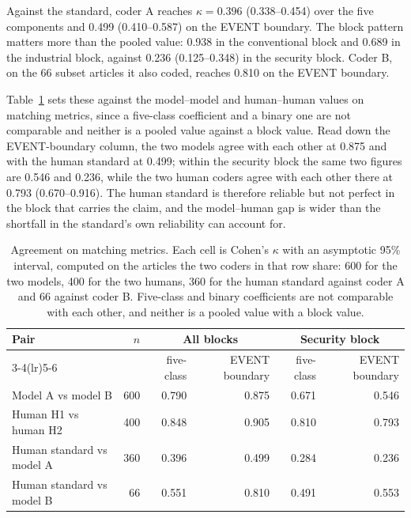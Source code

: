 \documentclass[1p,times]{elsarticle}
\begin{document}
Against the standard, coder A reaches $\kappa = 0.396$ (0.338--0.454) over the five components and 0.499 (0.410--0.587) on the EVENT boundary. The block pattern matters more than the pooled value: 0.938 in the conventional block and 0.689 in the industrial block, against 0.236 (0.125--0.348) in the security block. Coder B, on the 66 subset articles it also coded, reaches 0.810 on the EVENT boundary.

Table~\ref{tab:kappa} sets these against the model--model and human--human values on matching metrics, since a five-class coefficient and a binary one are not comparable and neither is a pooled value against a block value. Read down the EVENT-boundary column, the two models agree with each other at 0.875 and with the human standard at 0.499; within the security block the same two figures are 0.546 and 0.236, while the two human coders agree with each other there at 0.793 (0.670--0.916). The human standard is therefore reliable but not perfect in the block that carries the claim, and the model--human gap is wider than the shortfall in the standard's own reliability can account for.

\begin{table}[!htb]
\centering\small
\caption{Agreement on matching metrics. Each cell is Cohen's $\kappa$ with an asymptotic 95\% interval, computed on the articles the two coders in that row share: 600 for the two models, 400 for the two humans, 360 for the human standard against coder A and 66 against coder B. Five-class and binary coefficients are not comparable with each other, and neither is a pooled value with a block value.}
\label{tab:kappa}
\footnotesize\setlength{\tabcolsep}{4pt}
\begin{tabular*}{\textwidth}{@{\extracolsep{\fill}}lrrrrr@{}}
\toprule
Pair & $n$ & \multicolumn{2}{c}{All blocks} & \multicolumn{2}{c}{Security block} \\
\cmidrule(lr){3-4}\cmidrule(lr){5-6}
 & & five-class & EVENT boundary & five-class & EVENT boundary \\
\midrule
Model A vs model B & 600 & 0.790 & 0.875 & 0.671 & 0.546 \\
Human H1 vs human H2 & 400 & 0.848 & 0.905 & 0.810 & 0.793 \\
Human standard vs model A & 360 & 0.396 & 0.499 & 0.284 & 0.236 \\
Human standard vs model B & 66 & 0.551 & 0.810 & 0.491 & 0.553 \\
\bottomrule
\end{tabular*}
\end{table}
\end{document}
